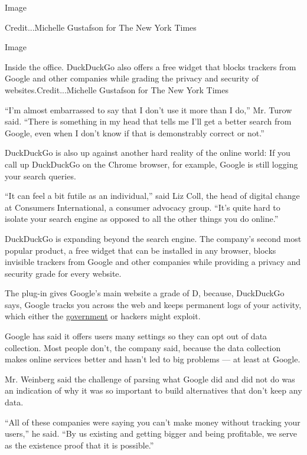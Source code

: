Image

Credit...Michelle Gustafson for The New York Times

Image

Inside the office. DuckDuckGo also offers a free widget that blocks
trackers from Google and other companies while grading the privacy and
security of websites.Credit...Michelle Gustafson for The New York Times

``I'm almost embarrassed to say that I don't use it more than I do,''
Mr. Turow said. ``There is something in my head that tells me I'll get a
better search from Google, even when I don't know if that is
demonstrably correct or not.''

DuckDuckGo is also up against another hard reality of the online world:
If you call up DuckDuckGo on the Chrome browser, for example, Google is
still logging your search queries.

``It can feel a bit futile as an individual,'' said Liz Coll, the head
of digital change at Consumers International, a consumer advocacy group.
``It's quite hard to isolate your search engine as opposed to all the
other things you do online.''

DuckDuckGo is expanding beyond the search engine. The company's second
most popular product, a free widget that can be installed in any
browser, blocks invisible trackers from Google and other companies while
providing a privacy and security grade for every website.

The plug-in gives Google's main website a grade of D, because,
DuckDuckGo says, Google tracks you across the web and keeps permanent
logs of your activity, which either the
\href{https://www.nytimes3xbfgragh.onion/interactive/2019/04/13/us/google-location-tracking-police.html}{government}
or hackers might exploit.

Google has said it offers users many settings so they can opt out of
data collection. Most people don't, the company said, because the data
collection makes online services better and hasn't led to big problems
--- at least at Google.

Mr. Weinberg said the challenge of parsing what Google did and did not
do was an indication of why it was so important to build alternatives
that don't keep any data.

``All of these companies were saying you can't make money without
tracking your users,'' he said. ``By us existing and getting bigger and
being profitable, we serve as the existence proof that it is possible.''

